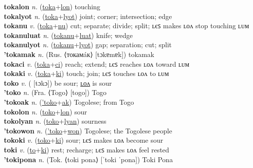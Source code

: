 \textbf{tokalon} \textit{n.} (\hyperref[toka]{toka}+\hyperref[lon]{lon})
touching \label{tokalon} \\
\textbf{tokalyot} \textit{n.} (\hyperref[toka]{toka}+\hyperref[lyot]{lyot})
joint; corner; intersection; edge \label{tokalyot} \\
\textbf{tokanu} \textit{v.} (\hyperref[toka]{toka}+\hyperref[nu]{nu})
cut; separate; divide; split; ʟєꜱ makes ʟᴏᴧ stop touching ʟᴜᴍ \label{tokanu} \\
\textbf{tokanuluat} \textit{n.} (\hyperref[tokanu]{tokanu}+\hyperref[luat]{luat})
knife; wedge \label{tokanuluat} \\
\textbf{tokanulyot} \textit{n.} (\hyperref[tokanu]{tokanu}+\hyperref[lyot]{lyot})
gap; separation; cut; split \label{tokanulyot} \\
\textbf{'tokamak} \textit{n.} (Rus. ⟨токамáк⟩ [tɔkɐmɐk])
tokamak \label{'tokamak} \\
\textbf{tokaci} \textit{v.} (\hyperref[toka]{toka}+\hyperref[ci]{ci})
reach; extend; ʟєꜱ reaches ʟᴏᴧ toward ʟᴜᴍ \label{tokaci} \\
\textbf{tokaki} \textit{v.} (\hyperref[toka]{toka}+\hyperref[ki]{ki})
touch; join; ʟєꜱ touches ʟᴏᴧ to ʟᴜᴍ \label{tokaki} \\
\textbf{toko} \textit{v.} ( [tɔkɔ])
be sour; \hyperref[tokolon]{ʟᴏᴧ} is sour \label{toko} \\
\textbf{'toko} \textit{n.} (Fra. ⟨Togo⟩ [togo])
Togo \label{'toko} \\
\textbf{'tokoak} \textit{n.} (\hyperref['toko]{'toko}+\hyperref[ak]{ak})
Togolese; from Togo \label{'tokoak} \\
\textbf{tokolon} \textit{n.} (\hyperref[toko]{toko}+\hyperref[lon]{lon})
sour \label{tokolon} \\
\textbf{tokolyan} \textit{n.} (\hyperref[toko]{toko}+\hyperref[lyan]{lyan})
sourness \label{tokolyan} \\
\textbf{'tokowon} \textit{n.} (\hyperref['toko]{'toko}+\hyperref[won]{won})
Togolese; the Togolese people \label{'tokowon} \\
\textbf{tokoki} \textit{v.} (\hyperref[toko]{toko}+\hyperref[ki]{ki})
sour; ʟєꜱ makes ʟᴏᴧ become sour \label{tokoki} \\
\textbf{toki} \textit{v.} (\hyperref[to]{to}+\hyperref[ki]{ki})
rest; recharge; ʟєꜱ makes ʟᴏᴧ feel rested \label{toki} \\
\textbf{'tokipona} \textit{n.} (Tok. ⟨toki pona⟩ [ˈtoki ˈpona])
Toki Pona \label{'tokipona} \\

